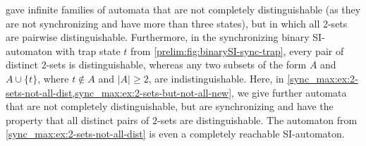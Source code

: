 
 gave infinite families of automata that are not completely distinguishable (as they are not synchronizing and have more than three states), but in which all $2$-sets are pairwise distinguishable.
Furthermore, in the synchronizing binary SI-automaton with trap state $t$ from \cref{prelim:fig:binarySI-sync-trap}, every pair of distinct $2$-sets is distinguishable, whereas any two subsets of the form $A$ and $A \cup \{t\}$, where $t \notin A$ and $|A| \ge 2$, are indistinguishable.
Here, in \cref{sync_max:ex:2-sets-not-all-dist,sync_max:ex:2-sets-but-not-all-new}, we give further automata that are not completely distinguishable, but are synchronizing and have the property that all distinct pairs of $2$-sets are distinguishable.
The automaton from \cref{sync_max:ex:2-sets-not-all-dist} 
is even a completely reachable SI-automaton.

